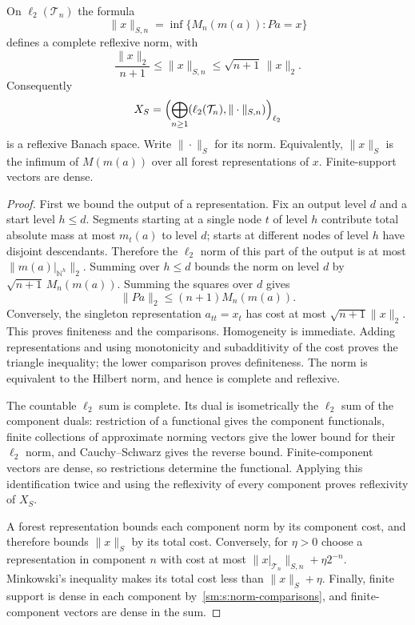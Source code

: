 \begin{proposition}\label{sm:s:space}
On $\ell_2(\mathcal T_n)$ the formula
\[
 \|x\|_{S,n}=\inf\{M_n(m(a)):Pa=x\}
\]
defines a complete reflexive norm, with
\begin{equation}\label{sm:s:norm-comparisons}
 \frac{\|x\|_2}{n+1}\le\|x\|_{S,n}
 \le\sqrt{n+1}\,\|x\|_2.
\end{equation}
Consequently
\[
 X_S=\Bigl(\bigoplus_{n\ge1}(\ell_2(\mathcal T_n),\|\cdot\|_{S,n})
       \Bigr)_{\ell_2}
\]
is a reflexive Banach space. Write $\|\cdot\|_S$ for its norm. Equivalently,
$\|x\|_S$ is the infimum of $M(m(a))$ over all forest representations of
$x$. Finite-support vectors are dense.
\end{proposition}
\begin{proof}
First we bound the output of a representation. Fix an output level $d$
and a start level $h\le d$. Segments starting at a single node $t$ of level
$h$ contribute total absolute mass at most $m_t(a)$ to level $d$; starts
at different nodes of level $h$ have disjoint descendants. Therefore the
$\ell_2$ norm of this part of the output is at most
$\|m(a)|_{\mathbb N^h}\|_2$. Summing over $h\le d$ bounds the norm on level
$d$ by $\sqrt{n+1}\,M_n(m(a))$. Summing the squares over $d$ gives
\begin{equation}\label{sm:s:output-bound}
 \|Pa\|_2\le(n+1)M_n(m(a)).
\end{equation}
Conversely, the singleton representation $a_{tt}=x_t$ has cost at most
$\sqrt{n+1}\|x\|_2$. This proves finiteness and the comparisons. Homogeneity
is immediate. Adding representations and using monotonicity and
subadditivity of the cost proves the triangle inequality; the lower
comparison proves definiteness. The norm is equivalent to the Hilbert
norm, and hence is complete and reflexive.

The countable $\ell_2$ sum is complete. Its dual is isometrically the
$\ell_2$ sum of the component duals: restriction of a functional gives
the component functionals, finite collections of approximate norming
vectors give the lower bound for their $\ell_2$ norm, and
Cauchy--Schwarz gives the reverse bound. Finite-component vectors are
dense, so restrictions determine the functional. Applying this
identification twice and using the reflexivity of every component proves
reflexivity of $X_S$.

A forest representation bounds each component norm by its component
cost, and therefore bounds $\|x\|_S$ by its total cost. Conversely, for
$\eta>0$ choose a representation in component $n$ with cost at most
$\|x|_{\mathcal T_n}\|_{S,n}+\eta2^{-n}$. Minkowski's inequality makes its
total cost less than $\|x\|_S+\eta$. Finally, finite support is dense in
each component by~\eqref{sm:s:norm-comparisons}, and finite-component
vectors are dense in the sum.
\end{proof}

